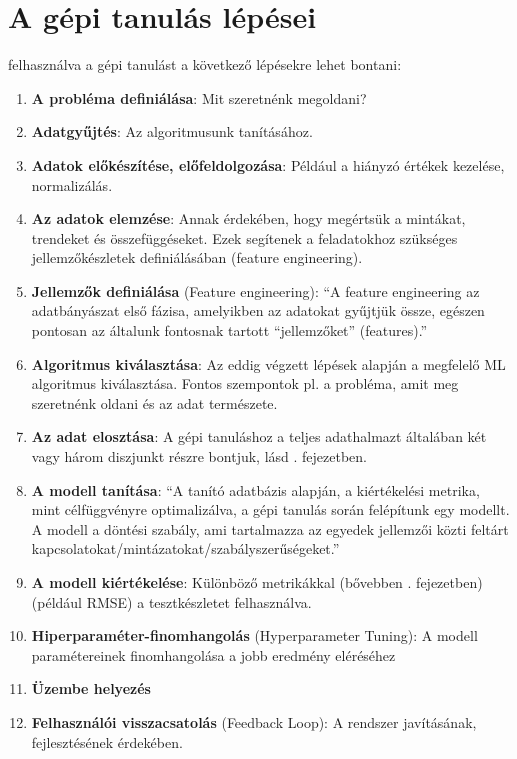 \documentclass[
]{thesis-ekf}
\theoremstyle{definition}
\theoremstyle{remark}
\begin{document}
\section{A gépi tanulás lépései}
\label{gepi-tanulas-lepesei}
	 felhasználva a gépi tanulást a következő lépésekre lehet bontani:
	\begin{enumerate}
		\item \textbf{A probléma definiálása}: Mit szeretnénk megoldani?
		\item \textbf{Adatgyűjtés}: Az algoritmusunk tanításához.
		\item \textbf{Adatok előkészítése, előfeldolgozása}: Például a hiányzó értékek kezelése, normalizálás.
		\item \textbf{Az adatok elemzése}: Annak érdekében, hogy megértsük a mintákat, trendeket és összefüggéseket. Ezek segítenek a feladatokhoz szükséges jellemzőkészletek definiálásában (feature engineering).
		\item \textbf{Jellemzők definiálása} (Feature engineering): ``A feature engineering az adatbányászat első fázisa, amelyikben az adatokat gyűjtjük össze, egészen pontosan az általunk fontosnak tartott “jellemzőket” (features).''\cite{featureengineeringmagyaritas}
		\item \textbf{Algoritmus kiválasztása}: Az eddig végzett lépések alapján a megfelelő ML algoritmus kiválasztása. Fontos szempontok pl. a probléma, amit meg szeretnénk oldani és az adat természete.
		\item \textbf{Az adat elosztása}: A gépi tanuláshoz a teljes adathalmazt általában két vagy három diszjunkt részre bontjuk, lásd . fejezetben.
		\item \textbf{A modell tanítása}: ``A tanító adatbázis alapján, a kiértékelési metrika, mint célfüggvényre optimalizálva, a gépi tanulás során felépítunk egy modellt. A modell a döntési szabály, ami tartalmazza az egyedek jellemzői közti feltárt kapcsolatokat\allowbreak/mintázatokat\allowbreak/szabályszerűségeket.''\cite{gepitanulasalapfogalmak}
		\item \textbf{A modell kiértékelése}: Különböző metrikákkal (bővebben . fejezetben) (például RMSE) a tesztkészletet felhasználva.
		\item \textbf{Hiperparaméter-finomhangolás} (Hyperparameter Tuning): A modell paramétereinek finomhangolása a jobb eredmény eléréséhez
		\item \textbf{Üzembe helyezés}
		\item \textbf{Felhasználói visszacsatolás} (Feedback Loop): A rendszer javításának, fejlesztésének érdekében.
	\end{enumerate}
	
\end{document}
